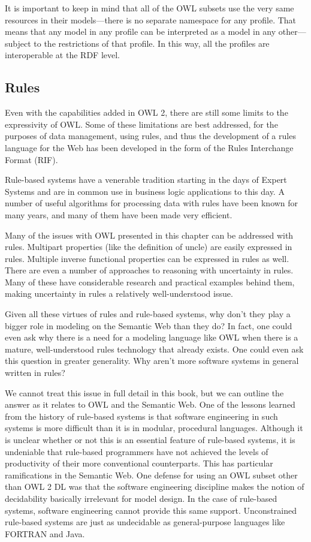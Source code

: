It is important to keep in mind that all of the OWL subsets use the very
same resources in their models---there is no separate namespace for any
profile. That means that any model in any profile can be interpreted as
a model in any other---subject to the restrictions of that profile. In
this way, all the profiles are interoperable at the RDF level.

\subsection{Rules}

Even with the capabilities added in OWL 2, there are still some limits
to the expressivity of OWL. Some of these limitations are best
addressed, for the purposes of data management, using rules, and thus
the development of a rules language for the Web has been developed in
the form of the Rules Interchange Format (RIF).

Rule-based systems have a venerable tradition starting in the days of
Expert Systems and are in common use in business logic applications to
this day. A number of useful algorithms for processing data with rules
have been known for many years, and many of them have been made very
efficient.

Many of the issues with OWL presented in this chapter can be addressed
with rules. Multipart
properties (like the definition of uncle) are easily expressed in rules.
Multiple inverse functional properties can be expressed in rules as
well. There are even a number of approaches to reasoning with
uncertainty in rules. Many of these have considerable research and
practical examples behind them, making uncertainty in rules a relatively
well-understood issue.

Given all these virtues of rules and rule-based systems, why don't they
play a bigger role in modeling on the Semantic Web than they do? In
fact, one could even ask why there is a need for a modeling language
like OWL when there is a mature, well-understood rules technology that
already exists. One could even ask this question in greater generality.
Why aren't more software systems in general written in rules?

We cannot treat this issue in full detail in this book, but we can
outline the answer as it relates to OWL and the Semantic Web. One of the
lessons learned from the history of rule-based systems is that software
engineering in such systems is more difficult than it is in modular,
procedural languages. Although it is unclear whether or not this is an
essential feature of rule-based systems, it is undeniable that
rule-based programmers have not achieved the levels of productivity of
their more conventional counterparts. This has particular ramifications
in the Semantic Web. One defense for using an OWL subset other than OWL
2 DL was that the software engineering discipline makes the notion of
decidability basically irrelevant for model design. In the case of
rule-based systems, software engineering cannot provide this same
support. Unconstrained rule-based systems are just as undecidable as
general-purpose languages like FORTRAN and Java.

